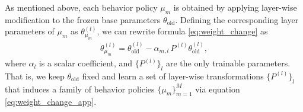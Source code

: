 As mentioned above, each behavior policy $\mu_m$ is obtained by applying layer-wise modification to the frozen base parameters $\theta_\text{old}$.
Defining the corresponding layer parameters of $\mu_m$ as $\theta_{\mu_m}^{(l)}$, we can rewrite formula \eqref{eq:weight_change} as
\begin{align}
\label{eq:weight_change_app}
\theta_{\mu_m}^{(l)} = \theta_\text{old}^{(l)} - \alpha_{m,l}\, P^{(l)} \theta_\text{old}^{(l)}, 
\end{align}
where $\alpha_{l}$ is a scalar coefficient,  and $\{P^{(l)}\}_l$ are the only trainable parameters.
That is, we keep $\theta_\text{old}$ fixed and learn a set of layer-wise transformations $\{P^{(l)}\}_l$ that induces a family of behavior policies $\{\mu_m\}_{m=1}^M$ via equation \eqref{eq:weight_change_app}.
